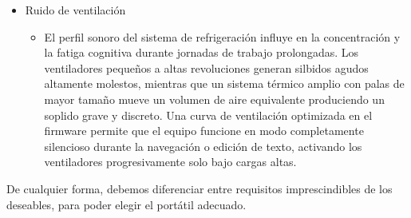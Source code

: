 \documentclass[11.5pt]{article}
\begin{document}
\begin{itemize}
\begin{itemize}
		\end{itemize}
		\item 	Ruido de ventilación
		\begin{itemize}
			\item El perfil sonoro del sistema de refrigeración influye en la concentración y la fatiga cognitiva durante jornadas de trabajo prolongadas. Los ventiladores pequeños a altas revoluciones generan silbidos agudos altamente molestos, mientras que un sistema térmico amplio con palas de mayor tamaño mueve un volumen de aire equivalente produciendo un soplido grave y discreto. Una curva de ventilación optimizada en el firmware permite que el equipo funcione en modo completamente silencioso durante la navegación o edición de texto, activando los ventiladores progresivamente solo bajo cargas altas.
		\end{itemize}
	\end{itemize}
	De cualquier forma, debemos diferenciar entre requisitos imprescindibles de los deseables, para poder elegir el portátil adecuado.
	
\end{document}
